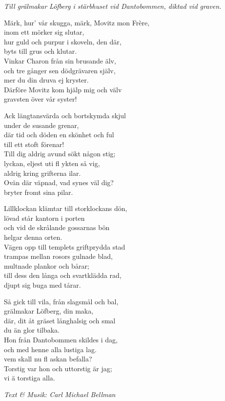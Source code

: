 {\footnotesize\textit{Till grälmakar Löfberg i stärbhuset vid Dantobommen, diktad vid graven.}}\par
\vspace{10pt}
Märk, hur' vår skugga, märk, Movitz mon Frère,\\
inom ett mörker sig slutar,\\
hur guld och purpur i skoveln, den där,\\
byts till grus och klutar.\\
Vinkar Charon från sin brusande älv,\\
och tre gånger sen dödgrävaren själv,\\
mer du din druva ej kryster.\\
Därföre Movitz kom hjälp mig och välv\\
gravsten över vår syster!\par
\vspace{10pt}
Ack längtansvärda och bortskymda skjul\\
under de susande grenar,\\
där tid och döden en skönhet och ful\\
till ett stoft förenar!\\
Till dig aldrig avund sökt någon stig;\\
lyckan, eljest uti fl ykten så vig,\\
aldrig kring grifterna ilar.\\
Ovän där väpnad, vad synes väl dig?\\
bryter fromt sina pilar.\par
\newpage
Lillklockan klämtar till storklockans dön,\\
lövad står kantorn i porten\\
och vid de skrålande gossarnas bön\\
helgar denna orten.\\
Vägen opp till templets griftprydda stad\\
trampas mellan rosors gulnade blad,\\
multnade plankor och bårar;\\
till dess den långa och svartklädda rad,\\
djupt sig buga med tårar.\par
\vspace{10pt}
Så gick till vila, från slagsmål och bal,\\
grälmakar Löfberg, din maka,\\
där, dit åt gräset långhalsig och smal\\
du än glor tilbaka.\\
Hon från Dantobommen skildes i dag,\\
och med henne alla lustiga lag.\\
vem skall nu fl askan befalla?\\
Torstig var hon och uttorstig är jag;\\
vi ä torstiga alla.\par
\vspace{10pt}
{\footnotesize\textit{Text \& Musik: Carl Michael Bellman}}
